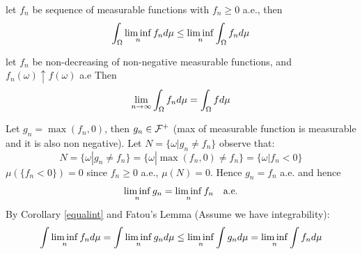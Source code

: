 \begin{cor}
let $f_n$ be sequence of measurable functions with $f_n \geq 0$ a.e., then 
\begin{equation*}
    \int_{\Omega} \liminf\limits_{n} f_n d\mu \leq \liminf\limits_{n}\int_{\Omega} f_n d\mu
\end{equation*}
\end{cor}

\begin{cor}
let $f_n$ be non-decreasing of non-negative measurable functions, and $f_n(\omega)\uparrow f(\omega)$ a.e Then 
\begin{equation*}
    \lim\limits_{n\rightarrow \infty} \int_\Omega f_n d\mu = \int_\Omega f d\mu
\end{equation*}
\end{cor}
\vspace{2cm}
\pf Let $g_n = \max(f_n, 0)$, then $g_n \in \mathcal{F}^+$ (max of measurable function is measurable and it is also non negative). Let $N = \{\omega| g_n \neq f_n\}$ observe that:
\begin{equation*}
    N = \{\omega| g_n \neq f_n\} = \{\omega| \max(f_n, 0) \neq f_n\} = \{\omega| f_n < 0\}
\end{equation*}$\mu(\{f_n< 0\}) = 0$ since $f_n \geq 0$ a.e., $\mu(N) = 0$. Hence $g_n = f_n$ a.e. and hence
\begin{equation*}
    \liminf\limits_{n} g_n = \liminf\limits_{n} f_n \quad \text{a.e.}
\end{equation*}
By Corollary \ref{equalint} and Fatou's Lemma (Assume we have integrability): 
\begin{equation*}
    \int \liminf\limits_{n}f_n d\mu = \int \liminf\limits_{n}g_n d\mu \leq  \liminf\limits_{n}\int g_n d\mu = \liminf\limits_{n}\int f_n d\mu
\end{equation*}
\newpage
